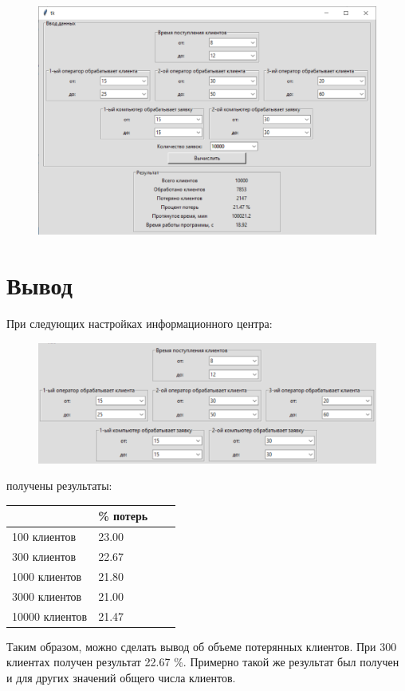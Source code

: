 \documentclass[12pt,a4paper,oneside]{report}
\begin{document}
\begin{figure}[!h]
	\centering
	\includegraphics[scale=0.7]{5.png}
	\label{fig:screenshot007}
\end{figure}

\clearpage
\newpage

\section*{Вывод}
При следующих настройках информационного центра:

\begin{figure}[!h]
	\centering
	\includegraphics[scale=0.8]{sett.png}
	\label{fig:screenshot008}
\end{figure}

получены результаты:

\begin{table}[h]
	\centering
	\label{tbl:auth_user}
	\begin{tabular}{|l|l|l|l|}
		\hline
		\textbf{} & \textbf{\% потерь}  \\ \hline
		 100 клиентов & 23.00 \\ \hline
		 300 клиентов & 22.67 \\ \hline
		 1000 клиентов & 21.80 \\ \hline
	     3000 клиентов & 21.00 \\ \hline
	     10000 клиентов & 21.47 \\ \hline
	\end{tabular}
\end{table}

Таким образом, можно сделать вывод об объеме потерянных клиентов. При 300 клиентах получен результат 22.67 \%. Примерно такой же результат был получен и для других значений общего числа клиентов. 
\end{document}
